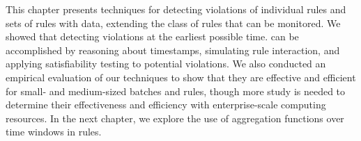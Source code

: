 This chapter presents techniques for detecting violations
of individual rules and sets of rules with data,
extending the class of rules that can be monitored.
We showed that detecting violations at the earliest possible time.
can be accomplished by reasoning about timestamps,
simulating rule interaction,
and applying satisfiability testing to potential violations.
We also conducted an empirical evaluation of our techniques
to show that they are effective and efficient
for small- and medium-sized batches
and rules,
though more study is needed
to determine their effectiveness and efficiency
with enterprise-scale computing resources.
In the next chapter,
we explore the use of aggregation functions
over time windows in rules.